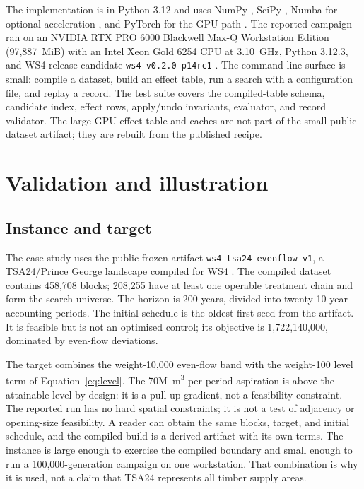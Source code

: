\documentclass[a4paper,fleqn]{cas-sc}
\begin{document}
The implementation is in Python 3.12 and uses NumPy \citep{harris2020}, SciPy \citep{virtanen2020},
Numba for optional acceleration \citep{lam2015}, and PyTorch for the GPU path \citep{paszke2019}. The
reported campaign ran on an NVIDIA RTX PRO 6000 Blackwell Max-Q Workstation Edition (97,887~MiB) with
an Intel Xeon Gold 6254 CPU at 3.10~GHz, Python 3.12.3, and WS4 release candidate \texttt{ws4-v0.2.0-p14rc1}
\citep{ws4}. The command-line surface is small: compile a dataset, build an effect table, run a search
with a configuration file, and replay a record. The test suite covers the compiled-table schema,
candidate index, effect rows, apply/undo invariants, evaluator, and record validator. The large GPU
effect table and caches are not part of the small public dataset artifact; they are rebuilt from the
published recipe.

\section{Validation and illustration}

\subsection{Instance and target}

The case study uses the public frozen artifact \texttt{ws4-tsa24-evenflow-v1}, a TSA24/Prince George
landscape compiled for WS4 \citep{tsa24artifact}. The compiled dataset contains 458,708 blocks; 208,255
have at least one operable treatment chain and form the search universe. The horizon is 200 years,
divided into twenty 10-year accounting periods. The initial schedule is the oldest-first seed from the
artifact. It is feasible but is not an optimised control; its objective is 1,722,140,000, dominated by
even-flow deviations.

The target combines the weight-10,000 even-flow band with the weight-100 level term of
Equation~\ref{eq:level}. The 70M~m\textsuperscript{3} per-period aspiration is above the attainable
level by design: it is a pull-up gradient, not a feasibility constraint. The reported run has no hard
spatial constraints; it is not a test of adjacency or opening-size feasibility. A reader can obtain the
same blocks, target, and initial schedule, and the compiled build is a derived artifact with its own
terms. The instance is large enough to exercise the compiled boundary and small enough to run a
100,000-generation campaign on one workstation. That combination is why it is used, not a claim that
TSA24 represents all timber supply areas.
\end{document}
